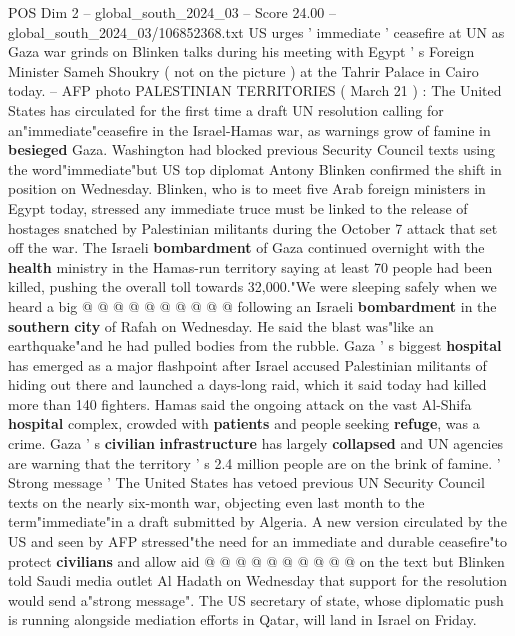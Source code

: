 \begin{textsample}{POS Dim 2 – global\_south\_2024\_03 – Score 24.00 – global\_south\_2024\_03/106852368.txt}  \label{ex:f2_pos_019}
US urges ' immediate ' ceasefire at UN as Gaza war grinds on Blinken talks during his meeting with Egypt ' s Foreign Minister Sameh Shoukry ( not on the picture ) at the Tahrir Palace in Cairo today. -- AFP photo PALESTINIAN TERRITORIES ( March 21 ) : The United States has circulated for the first time a draft UN resolution calling for an"immediate"ceasefire in the Israel-Hamas war, as warnings grow of famine in \textbf{besieged} Gaza.
Washington had blocked previous Security Council texts using the word"immediate"but US top diplomat Antony Blinken confirmed the shift in position on Wednesday.
Blinken, who is to meet five Arab foreign ministers in Egypt today, stressed any immediate truce must be linked to the release of hostages snatched by Palestinian militants during the October 7 attack that set off the war.
The Israeli \textbf{bombardment} of Gaza continued overnight with the \textbf{health} ministry in the Hamas-run territory saying at least 70 people had been killed, pushing the overall toll towards 32,000."We were sleeping safely when we heard a big @ @ @ @ @ @ @ @ @ @ following an Israeli \textbf{bombardment} in the \textbf{southern} \textbf{city} of Rafah on Wednesday.
He said the blast was"like an earthquake"and he had pulled bodies from the rubble.
Gaza ' s biggest \textbf{hospital} has emerged as a major flashpoint after Israel accused Palestinian militants of hiding out there and launched a days-long raid, which it said today had killed more than 140 fighters.
Hamas said the ongoing attack on the vast Al-Shifa \textbf{hospital} complex, crowded with \textbf{patients} and people seeking \textbf{refuge}, was a crime.
Gaza ' s \textbf{civilian} \textbf{infrastructure} has largely \textbf{collapsed} and UN agencies are warning that the territory ' s 2.4 million people are on the brink of famine. ' Strong message ' The United States has vetoed previous UN Security Council texts on the nearly six-month war, objecting even last month to the term"immediate"in a draft submitted by Algeria.
A new version circulated by the US and seen by AFP stressed"the need for an immediate and durable ceasefire"to protect \textbf{civilians} and allow aid @ @ @ @ @ @ @ @ @ @ on the text but Blinken told Saudi media outlet Al Hadath on Wednesday that support for the resolution would send a"strong message".
The US secretary of state, whose diplomatic push is running alongside mediation efforts in Qatar, will land in Israel on Friday.

\end{textsample}
